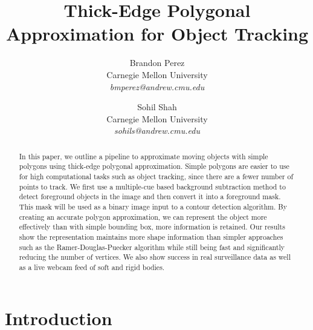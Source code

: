 \documentclass[10pt,twocolumn,letterpaper]{article}
\begin{document}
\title{Thick-Edge Polygonal Approximation for Object Tracking}

\author{
    Brandon Perez \\
    Carnegie Mellon University \\
    \textit{\small bmperez@andrew.cmu.edu} \\
    \and
	Sohil Shah \\
    Carnegie Mellon University \\
    \textit{\small sohils@andrew.cmu.edu} \\
}

\maketitle


\begin{abstract}
    In this paper, we outline a pipeline to approximate moving objects with simple polygons using thick-edge polygonal
    approximation. Simple polygons are easier to use for high computational tasks such as object tracking, since there
    are a fewer number of points to track. We first use a multiple-cue based background subtraction method to detect
    foreground objects in the image and then convert it into a foreground mask. This mask will be used as a binary image
    input to a contour detection algorithm. By creating an accurate polygon approximation, we can represent the object
    more effectively than with simple bounding box, more information is retained. Our results show the representation
    maintains more shape information than simpler approaches such as the Ramer-Douglas-Puecker algorithm while still
    being fast and significantly reducing the number of vertices. We also show success in real surveillance data as well
    as a live webcam feed of soft and rigid bodies.
\end{abstract}


\section{Introduction}
\end{document}
